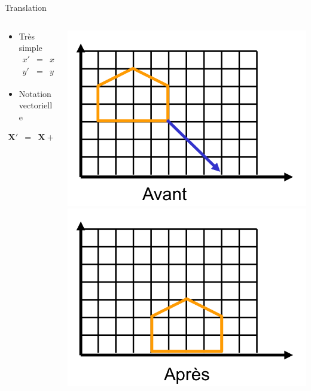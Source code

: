 \begin{frame}{Translation}
\begin{columns}
\begin{column}{.6\textwidth}
\begin{itemize}
\item Très simple
\begin{eqnarray*}
x' & = & x + t_x \\
y' & = & y + t_y
\end{eqnarray*}
\item Notation vectorielle
\end{itemize}
\begin{eqnarray}
\mathbf{X'} & = & \mathbf{X} + \mathbf{t}
\end{eqnarray}
\end{column}
\begin{column}{.39\textwidth}
\begin{center}
\includegraphics[width=.7\textwidth]{figs/trans2d1.png} \\
\includegraphics[width=.7\textwidth]{figs/trans2d2.png} \\

\end{center}
\end{column}
\end{columns}
\end{frame}

